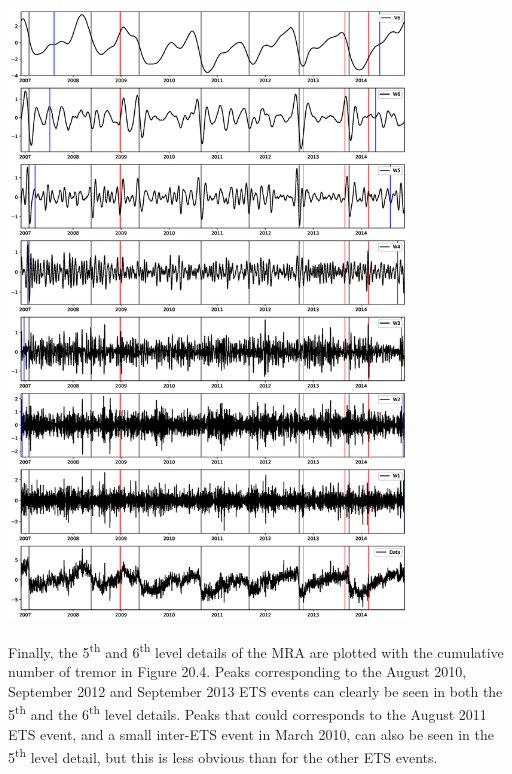 \documentclass[main.tex]{subfiles}
\begin{document}
\begin{center}
\includegraphics[width=300pt, trim={3.5cm 6cm 3.5cm 6.5cm},clip]{Figures/slowslip_results/Figure_3.eps}
\captionsetup{type=figure}
\end{center}

Finally, the 5\textsuperscript{th} and 6\textsuperscript{th} level details of the MRA are plotted with the cumulative number of tremor in Figure 20.4. Peaks corresponding to the August 2010, September 2012 and September 2013 ETS events can clearly be seen in both the 5\textsuperscript{th} and the 6\textsuperscript{th} level details. Peaks that could corresponds to the August 2011 ETS event, and a small inter-ETS event in March 2010, can also be seen in the 5\textsuperscript{th} level detail, but this is less obvious than for the other ETS events.
\end{document}
